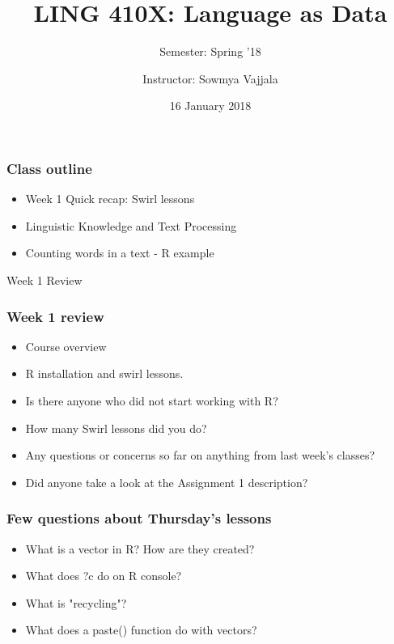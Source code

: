 \documentclass{beamer}
\author[Sowmya Vajjala]{Instructor: Sowmya Vajjala}
\title[LING 410X]{LING 410X: Language as Data}
\subtitle{Semester: Spring '18}
\date{16 January 2018}
\institute{Iowa State University, USA}
\begin{document}
\begin{frame}\titlepage
\end{frame}



\begin{frame}
\frametitle{Class outline}
\begin{itemize}
\item Week 1 Quick recap: Swirl lessons
\item Linguistic Knowledge and Text Processing
\item Counting words in a text - R example %
\end{itemize}
\end{frame}

\begin{frame}
\Large Week 1 Review
\end{frame}

\begin{frame}
\frametitle{Week 1 review}
\begin{itemize}
\item Course overview
\item R installation and swirl lessons.
\item Is there anyone who did not start working with R? \pause
\item How many Swirl lessons did you do? \pause
\item Any questions or concerns so far on anything from last week's classes? \pause
\item Did anyone take a look at the Assignment 1 description?
\end{itemize}
\end{frame}

\begin{frame}
\frametitle{Few questions about Thursday's lessons}
\begin{itemize}
\item What is a vector in R? How are they created? \pause
\item What does ?c do on R console? \pause
\item What is "recycling"?
\item What does a paste() function do with vectors? 
\end{itemize}
\end{frame}
\end{document}
